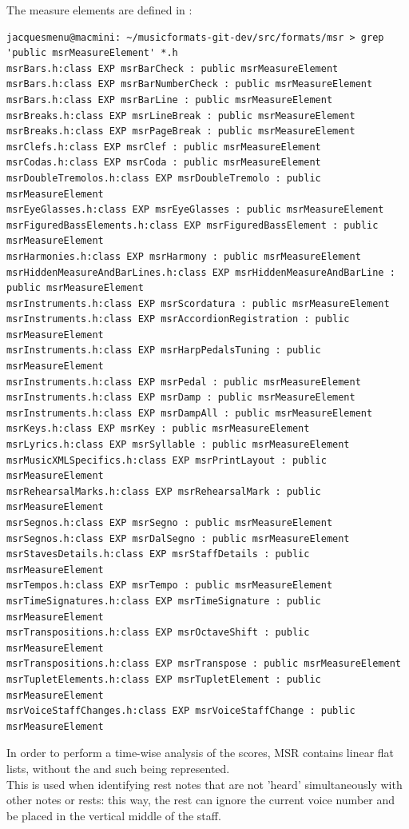 The measure elements are defined in \msr{}:
\begin{lstlisting}[language=Terminal]
jacquesmenu@macmini: ~/musicformats-git-dev/src/formats/msr > grep  'public msrMeasureElement' *.h
msrBars.h:class EXP msrBarCheck : public msrMeasureElement
msrBars.h:class EXP msrBarNumberCheck : public msrMeasureElement
msrBars.h:class EXP msrBarLine : public msrMeasureElement
msrBreaks.h:class EXP msrLineBreak : public msrMeasureElement
msrBreaks.h:class EXP msrPageBreak : public msrMeasureElement
msrClefs.h:class EXP msrClef : public msrMeasureElement
msrCodas.h:class EXP msrCoda : public msrMeasureElement
msrDoubleTremolos.h:class EXP msrDoubleTremolo : public msrMeasureElement
msrEyeGlasses.h:class EXP msrEyeGlasses : public msrMeasureElement
msrFiguredBassElements.h:class EXP msrFiguredBassElement : public msrMeasureElement
msrHarmonies.h:class EXP msrHarmony : public msrMeasureElement
msrHiddenMeasureAndBarLines.h:class EXP msrHiddenMeasureAndBarLine : public msrMeasureElement
msrInstruments.h:class EXP msrScordatura : public msrMeasureElement
msrInstruments.h:class EXP msrAccordionRegistration : public msrMeasureElement
msrInstruments.h:class EXP msrHarpPedalsTuning : public msrMeasureElement
msrInstruments.h:class EXP msrPedal : public msrMeasureElement
msrInstruments.h:class EXP msrDamp : public msrMeasureElement
msrInstruments.h:class EXP msrDampAll : public msrMeasureElement
msrKeys.h:class EXP msrKey : public msrMeasureElement
msrLyrics.h:class EXP msrSyllable : public msrMeasureElement
msrMusicXMLSpecifics.h:class EXP msrPrintLayout : public msrMeasureElement
msrRehearsalMarks.h:class EXP msrRehearsalMark : public msrMeasureElement
msrSegnos.h:class EXP msrSegno : public msrMeasureElement
msrSegnos.h:class EXP msrDalSegno : public msrMeasureElement
msrStavesDetails.h:class EXP msrStaffDetails : public msrMeasureElement
msrTempos.h:class EXP msrTempo : public msrMeasureElement
msrTimeSignatures.h:class EXP msrTimeSignature : public msrMeasureElement
msrTranspositions.h:class EXP msrOctaveShift : public msrMeasureElement
msrTranspositions.h:class EXP msrTranspose : public msrMeasureElement
msrTupletElements.h:class EXP msrTupletElement : public msrMeasureElement
msrVoiceStaffChanges.h:class EXP msrVoiceStaffChange : public msrMeasureElement
\end{lstlisting}


In order to perform a time-wise analysis of the scores, MSR contains  linear flat lists, without the  and such being represented.\\
This is used when identifying rest notes that are not 'heard' simultaneously with other notes or rests: this way, the rest can ignore the current voice number and be placed in the vertical middle of the staff.

